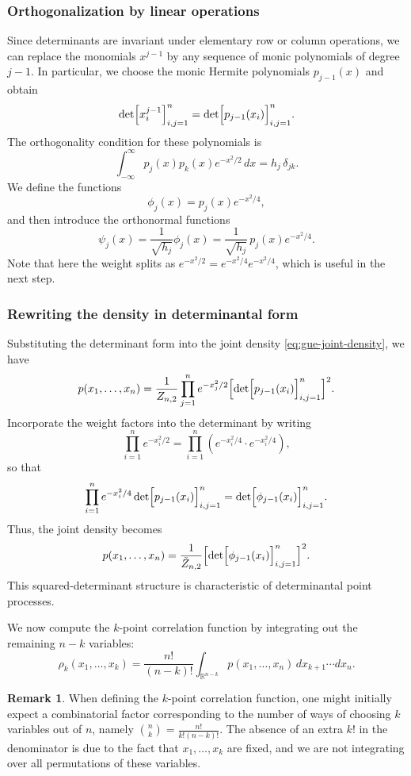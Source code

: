 \documentclass[letterpaper,11pt,oneside,reqno]{article}
\numberwithin{equation}{section}
\theoremstyle{definition}
\newtheorem{remark}[proposition]{Remark}
\begin{document}
\subsubsection{Orthogonalization by linear operations}

Since determinants are invariant under elementary row or column
operations, we can replace the monomials $x^{j-1}$ by
any sequence of monic polynomials of degree $j-1$. In
particular, we choose the monic Hermite polynomials
$p_{j-1}(x)$ and obtain
\[
\det\Bigl[x_i^{j-1}\Bigr]_{i,j=1}^n = \det\Bigl[p_{j-1}(x_i)\Bigr]_{i,j=1}^n.
\]
The orthogonality condition for these polynomials is
\[
\int_{-\infty}^\infty p_j(x)p_k(x)e^{-x^2/2}\,dx = h_j\,\delta_{jk}.
\]
We define the functions
\[
\phi_j(x)=p_j(x)e^{-x^2/4},
\]
and then introduce the orthonormal functions
\[
\psi_j(x)=\frac{1}{\sqrt{h_j}}\phi_j(x)=\frac{1}{\sqrt{h_j}}\,p_j(x)e^{-x^2/4}.
\]
Note that here the weight splits as $e^{-x^2/2}=e^{-x^2/4}e^{-x^2/4}$, which is useful in the next step.

\subsubsection{Rewriting the density in determinantal form}

Substituting the determinant form into the joint density \eqref{eq:gue-joint-density}, we have
\[
p(x_1,\dots,x_n)= \frac{1}{Z_{n,2}}\prod_{j=1}^n e^{-x_j^2/2} \Bigl[\det\Bigl[p_{j-1}(x_i)\Bigr]_{i,j=1}^n\Bigr]^2.
\]
Incorporate the weight factors into the determinant by writing
\[
\prod_{i=1}^n e^{-x_i^2/2} = \prod_{i=1}^n \left(e^{-x_i^2/4}\cdot e^{-x_i^2/4}\right),
\]
so that
\[
\prod_{i=1}^n e^{-x_i^2/4}\det\Bigl[p_{j-1}(x_i)\Bigr]_{i,j=1}^n = \det\Bigl[\phi_{j-1}(x_i)\Bigr]_{i,j=1}^n.
\]
Thus, the joint density becomes
\[
p(x_1,\dots,x_n)=\frac{1}{\tilde{Z}_{n,2}} \Bigl[\det\Bigl[\phi_{j-1}(x_i)\Bigr]_{i,j=1}^n\Bigr]^2.
\]
This squared-determinant structure is characteristic of determinantal point processes.

We now compute the $k$-point correlation function by integrating out the remaining $n-k$ variables:
\begin{equation*}
	\rho_k(x_1,\dots,x_k)=\frac{n!}{(n-k)!}\int_{\mathbb{R}^{n-k}} p(x_1,\dots,x_n) \,dx_{k+1}\cdots dx_n.
\end{equation*}
\begin{remark}
When defining the \(k\)-point correlation function, one might initially expect a combinatorial factor corresponding to the number of ways of choosing \(k\) variables out of \(n\), namely \(\binom{n}{k} = \frac{n!}{k!(n-k)!}\).
The absence of an extra \(k!\) in the denominator is due to the fact that $x_1,\ldots,x_k $
are fixed, and we are not integrating over all permutations of these variables.
\end{remark}
\end{document}
